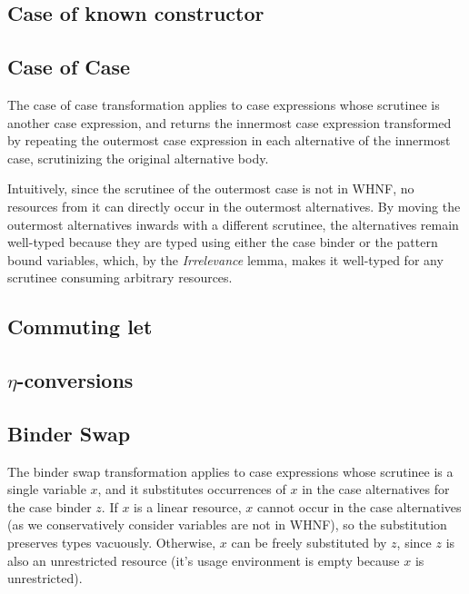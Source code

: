 \documentclass[acmsmall,review,anonymous,screen]{acmart}
\begin{document}
\subsection{Case of known constructor}



\subsection{Case of Case\label{sec:proof:caseofcase}}

The case of case transformation applies to case expressions whose scrutinee is
another case expression, and returns the innermost case expression transformed by repeating
the outermost case expression in each alternative of the innermost case,
scrutinizing the original alternative body.

Intuitively, since the scrutinee of the outermost case is not in WHNF, no
resources from it can directly occur in the outermost alternatives. By moving
the outermost alternatives inwards with a different scrutinee, the alternatives
remain well-typed because they are typed using either the case binder or the
pattern bound variables, which, by the \emph{Irrelevance} lemma, makes it
well-typed for any scrutinee consuming arbitrary resources.



\subsection{Commuting let}



\subsection{\texorpdfstring{$\eta$}{Eta}-conversions}



\subsection{Binder Swap}

The binder swap transformation applies to case expressions whose scrutinee is a
single variable $x$, and it substitutes occurrences of $x$ in the case
alternatives for the case binder $z$. If $x$ is a linear resource, $x$ cannot
occur in the case alternatives (as we conservatively consider variables are not
in WHNF), so the substitution preserves types vacuously. Otherwise, $x$ can be
freely substituted by $z$, since $z$ is also an unrestricted resource (it's
usage environment is empty because $x$ is unrestricted).
\end{document}
